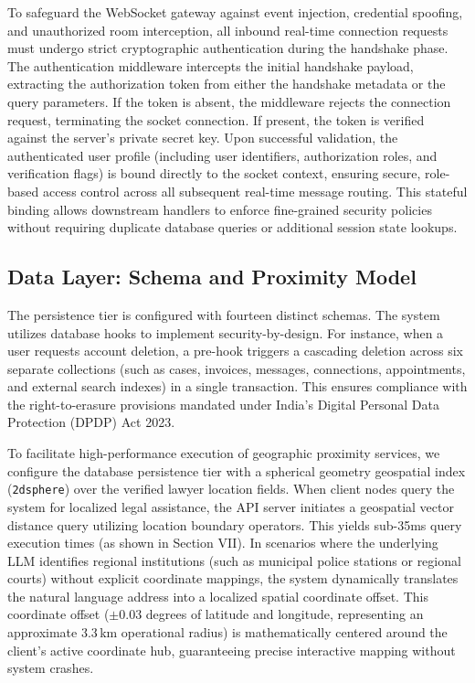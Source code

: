 \documentclass[conference]{IEEEtran}
\begin{document}
To safeguard the WebSocket gateway against event injection, credential spoofing, and unauthorized room interception, all inbound real-time connection requests must undergo strict cryptographic authentication during the handshake phase. The authentication middleware intercepts the initial handshake payload, extracting the authorization token from either the handshake metadata or the query parameters. If the token is absent, the middleware rejects the connection request, terminating the socket connection. If present, the token is verified against the server's private secret key. Upon successful validation, the authenticated user profile (including user identifiers, authorization roles, and verification flags) is bound directly to the socket context, ensuring secure, role-based access control across all subsequent real-time message routing. This stateful binding allows downstream handlers to enforce fine-grained security policies without requiring duplicate database queries or additional session state lookups.



\subsection{Data Layer: Schema and Proximity Model}
The persistence tier is configured with fourteen distinct schemas. The system utilizes database hooks to implement security-by-design. For instance, when a user requests account deletion, a pre-hook triggers a cascading deletion across six separate collections (such as cases, invoices, messages, connections, appointments, and external search indexes) in a single transaction. This ensures compliance with the right-to-erasure provisions mandated under India's Digital Personal Data Protection (DPDP) Act 2023.

To facilitate high-performance execution of geographic proximity services, we configure the database persistence tier with a spherical geometry geospatial index (\texttt{2dsphere}) over the verified lawyer location fields. When client nodes query the system for localized legal assistance, the API server initiates a geospatial vector distance query utilizing location boundary operators. This yields sub-35ms query execution times (as shown in Section VII). In scenarios where the underlying LLM identifies regional institutions (such as municipal police stations or regional courts) without explicit coordinate mappings, the system dynamically translates the natural language address into a localized spatial coordinate offset. This coordinate offset ($\pm 0.03$ degrees of latitude and longitude, representing an approximate 3.3\,km operational radius) is mathematically centered around the client's active coordinate hub, guaranteeing precise interactive mapping without system crashes.
\end{document}
